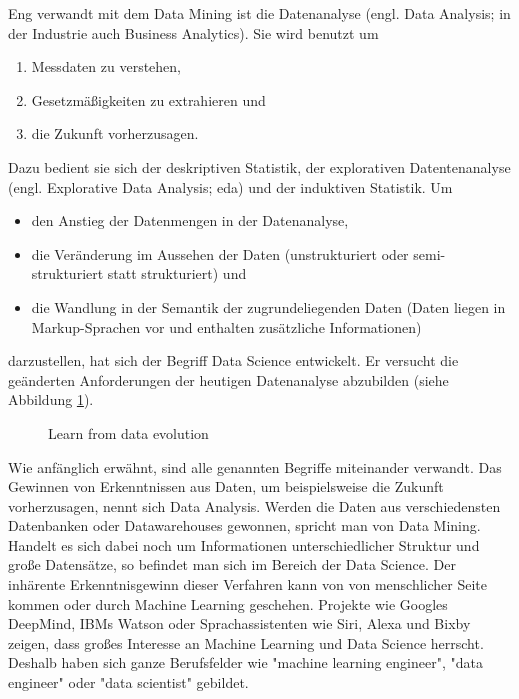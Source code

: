 Eng verwandt mit dem Data Mining ist die Datenanalyse (engl. Data Analysis; in der Industrie auch Business Analytics\citep[S.~58]{swamynathan_mastering_2017}). Sie wird benutzt um\citep[S.~2; Teil 1]{hertle_datenanalyse_2016}
\begin{enumerate}
\item Messdaten zu verstehen,
\item Gesetzmäßigkeiten zu extrahieren und
\item die Zukunft vorherzusagen.
\end{enumerate}
Dazu bedient sie sich der deskriptiven Statistik, der explorativen Datentenanalyse (engl. Explorative Data Analysis; \gls{eda}) und der induktiven Statistik.\citep[S.~17]{hertle_datenanalyse_2016}\newline
Um 
\begin{itemize}
\item den Anstieg der Datenmengen in der Datenanalyse,
\item die Veränderung im Aussehen der Daten (unstrukturiert oder semi-strukturiert statt strukturiert) und
\item die Wandlung in der Semantik der zugrundeliegenden Daten (Daten liegen in Markup-Sprachen vor und enthalten zusätzliche Informationen)
\end{itemize}
darzustellen, hat sich der Begriff Data Science entwickelt.\citep{dhar_data_2013} Er versucht die geänderten Anforderungen der heutigen Datenanalyse abzubilden (siehe Abbildung \ref{fig:dataEvolution}).

\begin{figure}[H]
\centering
{}
\caption{Learn from data evolution \citep[S.~66]{swamynathan_mastering_2017}}
\label{fig:dataEvolution}
\end{figure}
Wie anfänglich erwähnt, sind alle genannten Begriffe miteinander verwandt. Das Gewinnen von Erkenntnissen aus Daten, um beispielsweise die Zukunft vorherzusagen, nennt sich Data Analysis. Werden die Daten aus verschiedensten Datenbanken oder Datawarehouses gewonnen, spricht man von Data Mining. Handelt es sich dabei noch um Informationen unterschiedlicher Struktur und große Datensätze, so befindet man sich im Bereich der Data Science. Der inhärente Erkenntnisgewinn dieser Verfahren kann von von menschlicher Seite kommen oder durch Machine Learning geschehen.\newline
Projekte wie Googles DeepMind\citep{deepmind_deepmind_2017}, IBMs Watson\citep{international_business_machines_corporation_ibm_ibm_2017} oder Sprachassistenten wie Siri, Alexa und Bixby zeigen, dass großes Interesse an Machine Learning und Data Science herrscht. Deshalb haben sich ganze Berufsfelder wie "machine learning engineer", "data engineer" oder "data scientist"\citep[S.~1]{ramasubramanian_machine_2017} gebildet.


